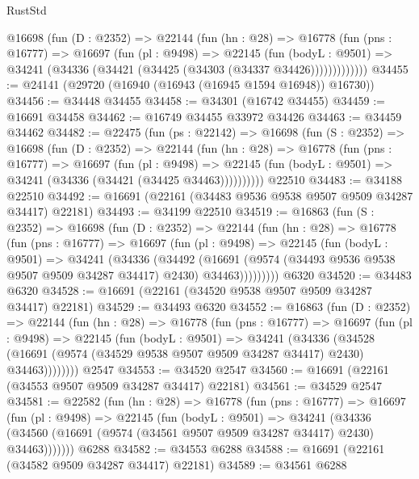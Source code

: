\begin{lexlean}{RustStd}
\begin{coremodule}
        @16698
          (fun (D : @2352) =>
          @22144
            (fun (hn : @28) =>
            @16778
              (fun (pns : @16777) =>
              @16697
                (fun (pl : @9498) =>
                @22145
                  (fun (bodyL : @9501) =>
                  @34241 (@34336 (@34421 (@34425 (@34303 (@34337 @34426)))))))))))))
@34455 := @24141 (@29720 (@16940 (@16943 (@16945 @1594 @16948)) @16730))
@34456 := @34448 @34455
@34458 := @34301 (@16742 @34455)
@34459 := @16691 @34458
@34462 := @16749 @34455 @33972 @34426
@34463 := @34459 @34462
@34482 := @22475
    (fun (ps : @22142) =>
    @16698
      (fun (S : @2352) =>
      @16698
        (fun (D : @2352) =>
        @22144
          (fun (hn : @28) =>
          @16778
            (fun (pns : @16777) =>
            @16697
              (fun (pl : @9498) =>
              @22145 (fun (bodyL : @9501) => @34241 (@34336 (@34421 (@34425 @34463))))))))))
    @22510
@34483 := @34188 @22510
@34492 := @16691 (@22161 (@34483 @9536 @9538 @9507 @9509 @34287 @34417) @22181)
@34493 := @34199 @22510
@34519 := @16863
    (fun (S : @2352) =>
    @16698
      (fun (D : @2352) =>
      @22144
        (fun (hn : @28) =>
        @16778
          (fun (pns : @16777) =>
          @16697
            (fun (pl : @9498) =>
            @22145
              (fun (bodyL : @9501) =>
              @34241
                (@34336
                  (@34492
                    (@16691
                      (@9574 (@34493 @9536 @9538 @9507 @9509 @34287 @34417) @2430)
                      @34463)))))))))
    @6320
@34520 := @34483 @6320
@34528 := @16691 (@22161 (@34520 @9538 @9507 @9509 @34287 @34417) @22181)
@34529 := @34493 @6320
@34552 := @16863
    (fun (D : @2352) =>
    @22144
      (fun (hn : @28) =>
      @16778
        (fun (pns : @16777) =>
        @16697
          (fun (pl : @9498) =>
          @22145
            (fun (bodyL : @9501) =>
            @34241
              (@34336
                (@34528
                  (@16691 (@9574 (@34529 @9538 @9507 @9509 @34287 @34417) @2430) @34463))))))))
    @2547
@34553 := @34520 @2547
@34560 := @16691 (@22161 (@34553 @9507 @9509 @34287 @34417) @22181)
@34561 := @34529 @2547
@34581 := @22582
    (fun (hn : @28) =>
    @16778
      (fun (pns : @16777) =>
      @16697
        (fun (pl : @9498) =>
        @22145
          (fun (bodyL : @9501) =>
          @34241
            (@34336 (@34560 (@16691 (@9574 (@34561 @9507 @9509 @34287 @34417) @2430) @34463)))))))
    @6288
@34582 := @34553 @6288
@34588 := @16691 (@22161 (@34582 @9509 @34287 @34417) @22181)
@34589 := @34561 @6288

\end{coremodule}
\end{lexlean}

